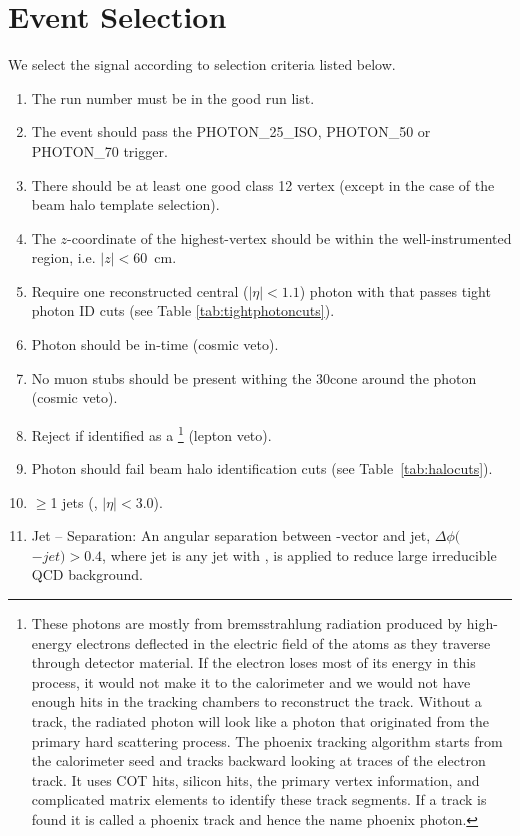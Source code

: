 \documentclass[11pt]{article}
\begin{document}
\section{Event Selection}
\label{sec:EventSelection}
We select the \phojets signal according to selection criteria listed below.

\begin{enumerate}
	\item The run number must be in the good run list.
	\item The event should pass the PHOTON\_25\_ISO, PHOTON\_50 or \mbox{PHOTON\_70} trigger.
	\item There should be at least one good class 12 vertex (except in the case of the beam halo template selection).
	\item The $z$-coordinate of the highest-\pt vertex should be within the well-instrumented region, i.e. \mbox{$|z|<60$~cm}.
	\item Require one reconstructed central ($|\eta|<1.1$) photon with  that passes tight photon ID cuts (see Table \ref{tab:tightphotoncuts}).
	\item Photon should be in-time \intimewindow (cosmic veto).
	\item No muon stubs should be present withing the 30\degree cone around the photon (cosmic veto).
	\item Reject if identified as a \footnote{These photons are mostly from bremsstrahlung radiation produced by high-energy electrons deflected in the electric field of the atoms as they traverse through detector material. If the electron loses most of its energy in this process, it would not make it to the calorimeter and we would not have enough hits in the tracking chambers to reconstruct the track. Without a track, the radiated photon will look like a photon that originated from the primary hard scattering process. The phoenix tracking algorithm starts from the calorimeter seed and tracks backward looking at traces of the electron track. It uses COT hits, silicon hits, the primary vertex information, and complicated matrix elements to identify these track segments. If a track is found it is called a phoenix track and hence the name phoenix photon.} (lepton veto).
	\item Photon should fail beam halo identification cuts (see Table~\ref{tab:halocuts}).
	\item $\geq$1 jets (, $|\eta|<3.0$).
	\item{Jet -- \metCorr Separation: An angular separation between \metCorr-vector and jet, $\Delta \phi($\metCorr$ - jet)>0.4$, where jet is any jet with , is applied to reduce large irreducible QCD background.}
\end{enumerate}
\end{document}
